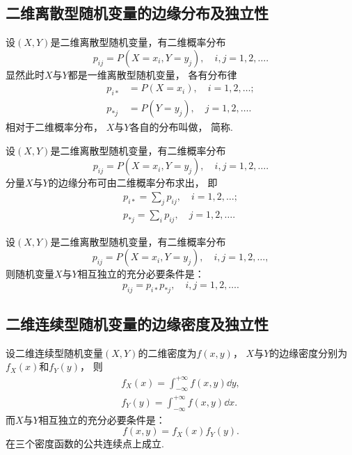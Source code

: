 \subsection{二维离散型随机变量的边缘分布及独立性}
\begin{definition}
设\((X,Y)\)是二维离散型随机变量，有二维概率分布\begin{equation*}
	p_{ij} = P(X=x_i,Y=y_j),
	\quad i,j=1,2,\dotsc.
\end{equation*}
显然此时\(X\)与\(Y\)都是一维离散型随机变量，
各有分布律\begin{align*}
	p_{i*} &= P(X=x_i),
	\quad i=1,2,\dotsc; \\
	p_{*j} &= P(Y=y_j),
	\quad j=1,2,\dotsc.
\end{align*}
相对于二维概率分布，
\(X\)与\(Y\)各自的分布叫做，
简称.
\end{definition}

\begin{theorem}
设\((X,Y)\)是二维离散型随机变量，有二维概率分布\begin{equation*}
	p_{ij} = P(X=x_i,Y=y_j),
	\quad i,j=1,2,\dotsc.
\end{equation*}
分量\(X\)与\(Y\)的边缘分布可由二维概率分布求出，
即\begin{gather*}
	p_{i*} = \sum_j p_{ij},
	\quad i=1,2,\dotsc; \\
	p_{*j} = \sum_i p_{ij},
	\quad j=1,2,\dotsc.
\end{gather*}
\end{theorem}

\begin{theorem}\label{theorem:多维随机变量及其分布.两个离散型随机变量相互独立的充分必要条件}
设\((X,Y)\)是二维离散型随机变量，有二维概率分布\begin{equation*}
	p_{ij} = P(X=x_i,Y=y_j),
	\quad i,j=1,2,\dotsc,
\end{equation*}
则随机变量\(X\)与\(Y\)相互独立的充分必要条件是：\begin{equation*}
	p_{ij} = p_{i*} p_{*j},
	\quad i,j=1,2,\dotsc.
\end{equation*}
\end{theorem}

\subsection{二维连续型随机变量的边缘密度及独立性}
\begin{theorem}\label{theorem:多维随机变量及其分布.两个连续型随机变量相互独立的充分必要条件}
设二维连续型随机变量\((X,Y)\)的二维密度为\(f(x,y)\)，
\(X\)与\(Y\)的边缘密度分别为\(f_X(x)\)和\(f_Y(y)\)，
则\begin{align*}
	f_X(x) = \int_{-\infty}^{+\infty} f(x,y) \dd{y}, \\
	f_Y(y) = \int_{-\infty}^{+\infty} f(x,y) \dd{x}.
\end{align*}
而\(X\)与\(Y\)相互独立的充分必要条件是：\begin{equation*}
	f(x,y) = f_X(x) f_Y(y).
\end{equation*}在三个密度函数的公共连续点上成立.
\end{theorem}
